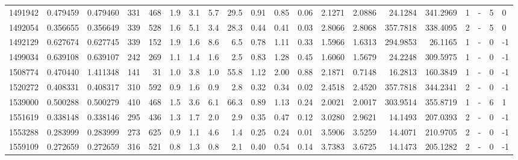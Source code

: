 \begin{tabular}{rrrrrrrrrrrrrrrrrlrl}
   1491942 & 0.479459 &   0.479460 &  331 &  468 &      1.9 &      3.1 &     5.7 &     29.5 &       0.91 &        0.85 &        0.06 &  2.1271 &  2.0886 &   24.1284 &  341.2969 &       1 &             - &        5 &         0 \\
   1492054 & 0.356655 &   0.356649 &  339 &  528 &      1.6 &      5.1 &     3.4 &     28.3 &       0.44 &        0.41 &        0.03 &  2.8066 &  2.8068 &  357.7818 &  338.4095 &       2 &             - &        5 &         0 \\
   1492129 & 0.627674 &   0.627745 &  339 &  152 &      1.9 &      1.6 &     8.6 &      6.5 &       0.78 &        1.11 &        0.33 &  1.5966 &  1.6313 &  294.9853 &   26.1165 &       1 &             - &        0 &        -1 \\
   1499034 & 0.639108 &   0.639107 &  242 &  269 &      1.1 &      1.4 &     1.6 &      2.5 &       0.83 &        1.28 &        0.45 &  1.6060 &  1.5679 &   24.2248 &  309.5975 &       1 &             - &        0 &        -1 \\
   1508774 & 0.470440 &   1.411348 &  141 &   31 &      1.0 &      3.8 &     1.0 &     55.8 &       1.12 &        2.00 &        0.88 &  2.1871 &  0.7148 &   16.2813 &  160.3849 &       1 &             - &        0 &        -1 \\
   1520272 & 0.408331 &   0.408317 &  310 &  592 &      0.9 &      1.6 &     0.9 &      2.8 &       0.32 &        0.34 &        0.02 &  2.4518 &  2.4520 &  357.7818 &  344.2341 &       2 &             - &        0 &        -1 \\
   1539000 & 0.500288 &   0.500279 &  410 &  468 &      1.5 &      3.6 &     6.1 &     66.3 &       0.89 &        1.13 &        0.24 &  2.0021 &  2.0017 &  303.9514 &  355.8719 &       1 &             - &        6 &         1 \\
   1551619 & 0.338148 &   0.338146 &  295 &  436 &      1.3 &      1.7 &     2.0 &      2.9 &       0.35 &        0.47 &        0.12 &  3.0280 &  2.9621 &   14.1493 &  207.0393 &       2 &             - &        0 &        -1 \\
   1553288 & 0.283999 &   0.283999 &  273 &  625 &      0.9 &      1.1 &     4.6 &      1.4 &       0.25 &        0.24 &        0.01 &  3.5906 &  3.5259 &   14.4071 &  210.9705 &       2 &             - &        0 &        -1 \\
   1559109 & 0.272659 &   0.272659 &  316 &  521 &      0.8 &      1.3 &     0.8 &      2.1 &       0.40 &        0.54 &        0.14 &  3.7383 &  3.6725 &   14.1473 &  205.1282 &       2 &             - &        0 &        -1 \\

\end{tabular}
